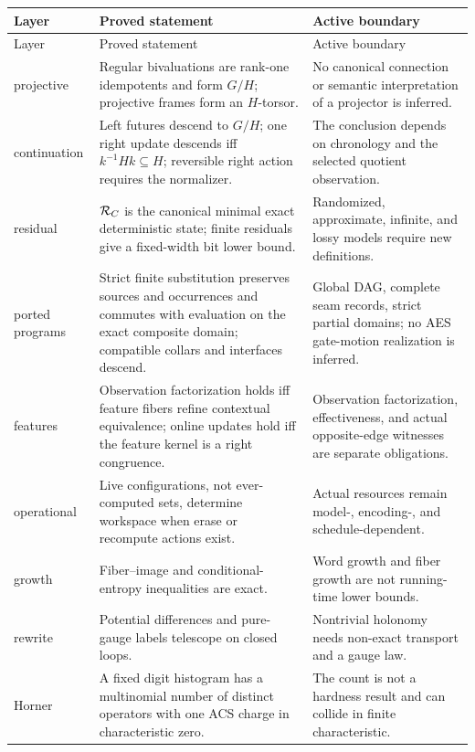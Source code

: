 \begin{center}
\begin{longtable}{L{0.16\textwidth}L{0.46\textwidth}L{0.27\textwidth}}
\toprule
Layer & Proved statement & Active boundary\\
\midrule
\endfirsthead
\toprule
Layer & Proved statement & Active boundary\\
\midrule
\endhead
projective & Regular bivaluations are rank-one idempotents and form $G/H$; projective frames form an $H$-torsor. & No canonical connection or semantic interpretation of a projector is inferred.\\
continuation & Left futures descend to $G/H$; one right update descends iff $k^{-1}Hk\subseteq H$; reversible right action requires the normalizer. & The conclusion depends on chronology and the selected quotient observation.\\
residual & $\mathcal R_C$ is the canonical minimal exact deterministic state; finite residuals give a fixed-width bit lower bound. & Randomized, approximate, infinite, and lossy models require new definitions.\\
ported programs & Strict finite substitution preserves sources and occurrences and commutes with evaluation on the exact composite domain; compatible collars and interfaces descend. & Global DAG, complete seam records, strict partial domains; no AES gate-motion realization is inferred.\\
features & Observation factorization holds iff feature fibers refine contextual equivalence; online updates hold iff the feature kernel is a right congruence. & Observation factorization, effectiveness, and actual opposite-edge witnesses are separate obligations.\\
operational & Live configurations, not ever-computed sets, determine workspace when erase or recompute actions exist. & Actual resources remain model-, encoding-, and schedule-dependent.\\
growth & Fiber--image and conditional-entropy inequalities are exact. & Word growth and fiber growth are not running-time lower bounds.\\
rewrite & Potential differences and pure-gauge labels telescope on closed loops. & Nontrivial holonomy needs non-exact transport and a gauge law.\\
Horner & A fixed digit histogram has a multinomial number of distinct operators with one ACS charge in characteristic zero. & The count is not a hardness result and can collide in finite characteristic.\\

\end{longtable}
\end{center}
